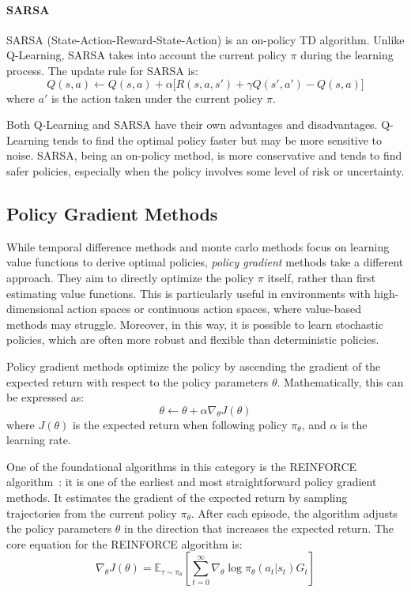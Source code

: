  \paragraph*{SARSA}
 SARSA (State-Action-Reward-State-Action) is an on-policy TD algorithm. 
  Unlike Q-Learning, SARSA takes into account the current policy \(\pi\) during the learning process. The update rule for SARSA is:
 \begin{equation}
 Q(s, a) \leftarrow Q(s, a) + \alpha \Big[ R(s, a, s') + \gamma Q(s', a') - Q(s, a) \Big]
 \end{equation}
 where \(a'\) is the action taken under the current policy \(\pi\).
 
 Both Q-Learning and SARSA have their own advantages and disadvantages. 
  Q-Learning tends to find the optimal policy faster but may be more sensitive to noise. SARSA, being an on-policy method, is more conservative and tends to find safer policies, especially when the policy involves some level of risk or uncertainty.

\subsection{Policy Gradient Methods}

While temporal difference methods and monte carlo methods focus on learning value functions to derive optimal policies, \emph{policy gradient} methods take a different approach. 
  They aim to directly optimize the policy \(\pi\) itself, 
  rather than first estimating value functions. 
  This is particularly useful in environments with high-dimensional action spaces or continuous action spaces, where value-based methods may struggle.
  Moreover, in this way, it is possible to learn stochastic policies,
    which are often more robust and flexible than deterministic policies.

Policy gradient methods optimize the policy by ascending the gradient of the expected return with respect to the policy parameters \(\theta\). 
Mathematically, this can be expressed as:
\begin{equation}
\theta \leftarrow \theta + \alpha \nabla_\theta J(\theta)
\end{equation}
where \(J(\theta)\) is the expected return when following policy \(\pi_\theta\), and \(\alpha\) is the learning rate.

One of the foundational algorithms in this category is the REINFORCE algorithm~\cite{DBLP:conf/nips/SuttonMSM99}: it is one of the earliest and most straightforward policy gradient methods. 
It estimates the gradient of the expected return by sampling trajectories from the current policy \(\pi_\theta\). 
After each episode, the algorithm adjusts the policy parameters \(\theta\) in the direction that increases the expected return.
%
The core equation for the REINFORCE algorithm is:
\begin{equation}
\nabla_\theta J(\theta) = \mathbb{E}_{\tau \sim \pi_\theta} \left[ \sum_{t=0}^{\infty} \nabla_\theta \log \pi_\theta(a_t | s_t) G_t \right]
\end{equation}

